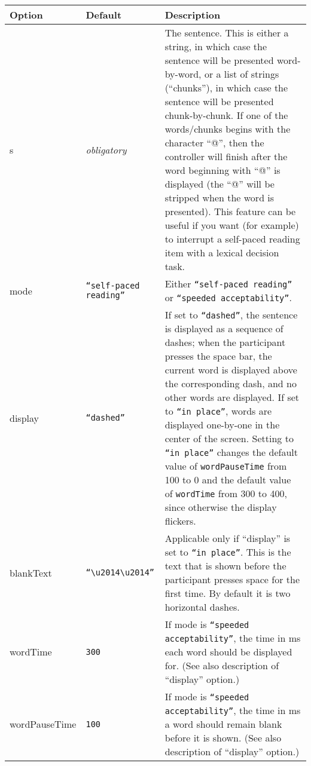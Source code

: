 \documentclass[11pt,letterpaper]{article}
\begin{document}
\footnotesize
\begin{RaggedRight}
\sloppy
\begin{tabular}{|p{1.0146in}|p{1.0279in}|p{3.4575in}|}
\hline
 \textbf{Option}       &  \textbf{Default}               &  \textbf{Description}                                               \\
\hline
 s              & \textit{ obligatory}             &  The sentence. This is either a string, in which case the sentence will be presented word-by-word, or a list of strings (``chunks''), in which case the sentence will be presented chunk-by-chunk. If one of the words/chunks begins with the character ``@'', then the controller will finish after the word beginning with ``@'' is displayed (the ``@'' will be stripped when the word is presented). This feature can be useful if you want (for example) to interrupt a self-paced reading item with a lexical decision task. \\
\hline
 mode           &  \texttt{``self-paced reading''}  &  Either \texttt{``self-paced reading''} or \texttt{``speeded acceptability''}. \\
\hline
 display        &  \texttt{``dashed''}              &  If set to \texttt{``dashed''}, the sentence is displayed as a sequence of dashes; when the participant presses the space bar, the current  word is displayed above the corresponding dash, and no other words are displayed. If set to \texttt{``in place''}, words are displayed one-by-one in the center of the screen. Setting to \texttt{``in place''} changes the default value of \texttt{wordPauseTime} from 100 to 0 and the default value of \texttt{wordTime} from 300 to 400, since otherwise the display flickers. \\
\hline
 blankText      &  \texttt{``{\textbackslash}u2014{\textbackslash}u2014''}  &  Applicable only if ``display'' is set to \texttt{``in place''}. This is the text that is shown before the participant presses space for the first time. By default it is two horizontal dashes. \\
\hline
 wordTime       &  \texttt{300}                   &  If mode is \texttt{``speeded acceptability''}, the time in ms each word should be displayed for. (See also description of ``display'' option.) \\
\hline
 wordPauseTime  &  \texttt{100}                   &  If mode is \texttt{``speeded acceptability''}, the time in ms a word should remain blank before it is shown. (See also description of ``display'' option.) \\
\hline

\end{tabular}
\end{RaggedRight}
\end{document}
